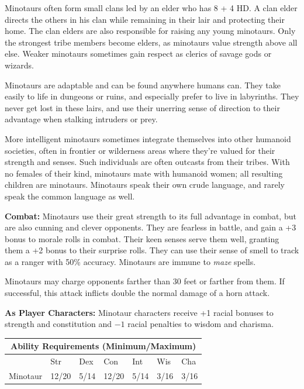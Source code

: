 \begin{multicols}{2}
Minotaurs often form small clans led by an elder who has 8 + 4 HD. A clan elder directs the others in his clan while remaining in their lair and protecting their home. The clan elders are also responsible for raising any young minotaurs. Only the strongest tribe members become elders, as minotaurs value strength above all else. Weaker minotaurs sometimes gain respect as clerics of savage gods or wizards.

Minotaurs are adaptable and can be found anywhere humans can. They take easily to life in dungeons or ruins, and especially prefer to live in labyrinths. They never get lost in these lairs, and use their unerring sense of direction to their advantage when stalking intruders or prey.

More intelligent minotaurs sometimes integrate themselves into other humanoid societies, often in frontier or wilderness areas where they're valued for their strength and senses. Such individuals are often outcasts from their tribes. With no females of their kind, minotaurs mate with humanoid women; all resulting children are minotaurs. Minotaurs speak their own crude language, and rarely speak the common language as well.

\textbf{Combat:} Minotaurs use their great strength to its full advantage in combat, but are also cunning and clever opponents. They are fearless in battle, and gain a +3 bonus to morale rolls in combat. Their keen senses serve them well, granting them a +2 bonus to their surprise rolls. They can use their sense of smell to track as a ranger with 50\% accuracy. Minotaurs are immune to \textit{maze} spells.

Minotaurs may charge opponents farther than 30 feet or farther from them. If successful, this attack inflicts double the normal damage of a horn attack.

\textbf{As Player Characters:} Minotaur characters receive +1 racial bonuses to strength and constitution and $-1$ racial penalties to wisdom and charisma.

\noindent \begin{minipage}{\columnwidth}

\noindent \begin{tabular}{|p{}|p{}|p{}|p{}|p{}|p{}|p{}|}
\multicolumn{7}{c}{Ability Requirements (Minimum/Maximum)} \\
\hline
	& Str	& Dex	& Con	& Int	& Wis	& Cha	\\
\hline\hline
\rowcolor[gray]{.9}Minotaur	& 12/20	& 5/14	& 12/20	& 5/14	& 3/16	& 3/16	\\
\hline
\end{tabular}


\end{minipage}
\end{multicols}

